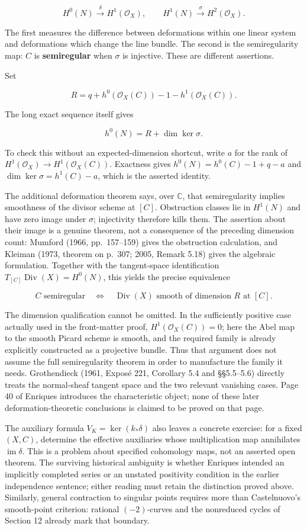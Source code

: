 \[
H^0(N)\xrightarrow{\delta}H^1(\mathcal O_X),\qquad
H^1(N)\xrightarrow{\sigma}H^2(\mathcal O_X).
\]

The first measures the difference between deformations within one linear system and deformations which change the line bundle. The second is the semiregularity map: \(C\) is \textbf{semiregular} when \(\sigma\) is injective. These are different assertions.

Set

\[
R=q+h^0(\mathcal O_X(C))-1-h^1(\mathcal O_X(C)).
\]

The long exact sequence itself gives

\[
h^0(N)=R+\dim\ker\sigma.
\]

To check this without an expected-dimension shortcut, write \(a\) for the rank of \(H^1(\mathcal O_X)\to H^1(\mathcal O_X(C))\). Exactness gives \(h^0(N)=h^0(C)-1+q-a\) and \(\dim\ker\sigma=h^1(C)-a\), which is the asserted identity.

The additional deformation theorem says, over \(\mathbb C\), that semiregularity implies smoothness of the divisor scheme at \([C]\). Obstruction classes lie in \(H^1(N)\) and have zero image under \(\sigma\); injectivity therefore kills them. The assertion about their image is a genuine theorem, not a consequence of the preceding dimension count: Mumford (1966, pp.~157--159) gives the obstruction calculation, and Kleiman (1973, theorem on p.~307; 2005, Remark 5.18) gives the algebraic formulation. Together with the tangent-space identification \(T_{[C]}\operatorname{Div}(X)=H^0(N)\), this yields the precise equivalence

\[
C\text{ semiregular}
\quad\Longleftrightarrow\quad
\operatorname{Div}(X)\text{ smooth of dimension }R\text{ at }[C].
\]

The dimension qualification cannot be omitted. In the sufficiently positive case actually used in the front-matter proof, \(H^1(\mathcal O_X(C))=0\); here the Abel map to the smooth Picard scheme is smooth, and the required family is already explicitly constructed as a projective bundle. Thus that argument does not assume the full semiregularity theorem in order to manufacture the family it needs. Grothendieck (1961, Exposé 221, Corollary 5.4 and §§5.5--5.6) directly treats the normal-sheaf tangent space and the two relevant vanishing cases. Page 40 of Enriques introduces the characteristic object; none of these later deformation-theoretic conclusions is claimed to be proved on that page.

The auxiliary formula \(V_K=\ker(k_*\delta)\) also leaves a concrete exercise: for a fixed \((X,C)\), determine the effective auxiliaries whose multiplication map annihilates \(\operatorname{im}\delta\). This is a problem about specified cohomology maps, not an asserted open theorem. The surviving historical ambiguity is whether Enriques intended an implicitly completed series or an unstated positivity condition in the earlier independence sentence; either reading must retain the distinction proved above. Similarly, general contraction to singular points requires more than Castelnuovo's smooth-point criterion: rational \((-2)\)-curves and the nonreduced cycles of Section 12 already mark that boundary.

